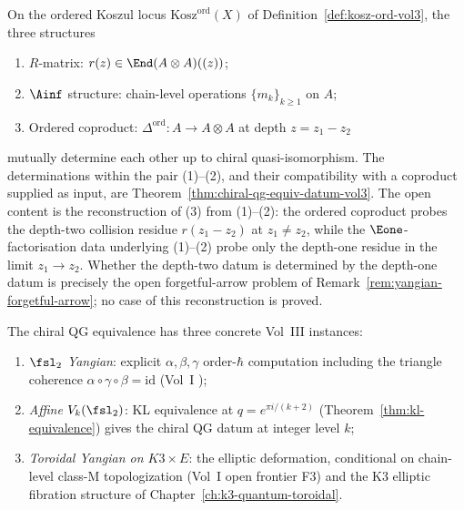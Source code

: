 \begin{conjecture}
\label{thm:chiral-qg-equiv-vol3}
On the ordered Koszul locus $\mathrm{Kosz}^{\mathrm{ord}}(X)$ of
Definition~\ref{def:kosz-ord-vol3}, the three structures
\begin{enumerate}[label=(\arabic*)]
 \item $R$-matrix: $r(z) \in \End(A \otimes A)((z))$;
 \item $\Ainf$ structure: chain-level operations
 $\{m_k\}_{k \geq 1}$ on $A$;
 \item Ordered coproduct: $\Delta^{\mathrm{ord}} \colon A \to
 A \otimes A$ at depth $z = z_1 - z_2$
\end{enumerate}
mutually determine each other up to chiral quasi-isomorphism.
The determinations within the pair (1)--(2), and their
compatibility with a coproduct supplied as input, are
Theorem~\ref{thm:chiral-qg-equiv-datum-vol3}. The open content is
the reconstruction of (3) from (1)--(2): the ordered coproduct
probes the depth-two collision residue $r(z_1 - z_2)$ at
$z_1 \neq z_2$, while the $\Eone$-factorisation data underlying
(1)--(2) probe only the depth-one residue in the limit
$z_1 \to z_2$. Whether the depth-two datum is determined by the
depth-one datum is precisely the open forgetful-arrow problem of
Remark~\ref{rem:yangian-forgetful-arrow}; no case of this
reconstruction is proved.
\end{conjecture}

\begin{remark}
\label{rem:vol3-concrete-qg-instances}
The chiral QG equivalence has three concrete Vol~III instances:
\begin{enumerate}[label=(\alph*)]
 \item \emph{$\fsl_2$ Yangian}: explicit $\alpha, \beta, \gamma$
 order-$\hbar$ computation including the triangle coherence
 $\alpha \circ \gamma \circ \beta = \mathrm{id}$ (Vol~I
 \cite{VolI});
 \item \emph{Affine $V_k(\fsl_2)$}: KL equivalence at
 $q = e^{\pi i / (k+2)}$ (Theorem~\ref{thm:kl-equivalence})
 gives the chiral QG datum at integer level $k$;
 \item \emph{Toroidal Yangian on $K3 \times E$}: the elliptic
 deformation, conditional on chain-level class-M topologization
 (Vol~I open frontier F3) and the K3 elliptic fibration
 structure of Chapter~\ref{ch:k3-quantum-toroidal}.
\end{enumerate}
\end{remark}

